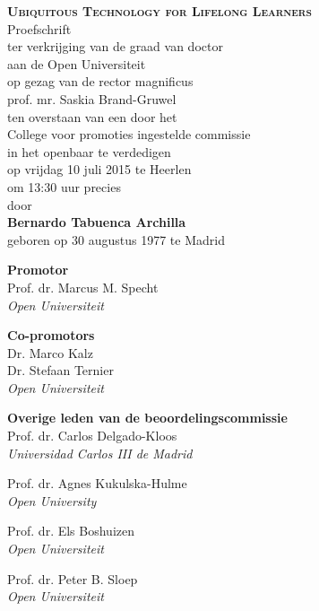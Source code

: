 \documentclass[normalheadings,tablecaptionabove,twoside,openright,chapterprefix,halfparskip,fontsize=10pt,numbers=noenddot]{scrbook} %
\begin{document}
\begin{titlepage}
	\newpage
	\null\vspace*{15.25em}
	\center
	\huge
	\textbf{\textsc{Ubiquitous Technology for Lifelong Learners}}\\
	\vspace{2em}
	\normalsize
	Proefschrift\\
	\vspace{1em}
	ter verkrijging  van de graad van doctor \\
	aan de Open Universiteit \\
	op gezag van de rector magnificus \\
	prof. mr. Saskia Brand-Gruwel \\
	ten overstaan van een door het \\
	College voor promoties ingestelde commissie \\
	in het openbaar te verdedigen\\
	\vspace{1em}
	op vrijdag 10 juli 2015 te Heerlen \\
	om 13:30 uur precies\\
	\vspace{1em}
	door\\
	\vspace{1em}
	\textbf{Bernardo Tabuenca Archilla}\\
	geboren op 30 augustus 1977 te Madrid\\
	\vfill\null
	
	\newpage
	\null\vfill
	\raggedright
	\textbf{Promotor} \\
	Prof. dr. Marcus M. Specht \\
	\textit{Open Universiteit} \par
	\textbf{Co-promotors} \\
	Dr. Marco Kalz \\
	Dr. Stefaan Ternier \\	
	\textit{Open Universiteit} \par
	\textbf{Overige leden van de beoordelingscommissie}\\
	Prof. dr. Carlos Delgado-Kloos \\
	\textit{Universidad Carlos III de Madrid} \par
	Prof. dr. Agnes Kukulska-Hulme \\
	\textit{Open University}  \par
	Prof. dr. Els Boshuizen \\
	\textit{Open Universiteit} \par
	Prof. dr. Peter B. Sloep \\
	\textit{Open Universiteit}

	\newpage
	\null\vspace*{15.25em}
	\begin{quote}
	\end{quote}
	\vfill\null
	\clearpage{\pagestyle{empty}\cleardoublepage}
\end{titlepage}
	
\end{document}
